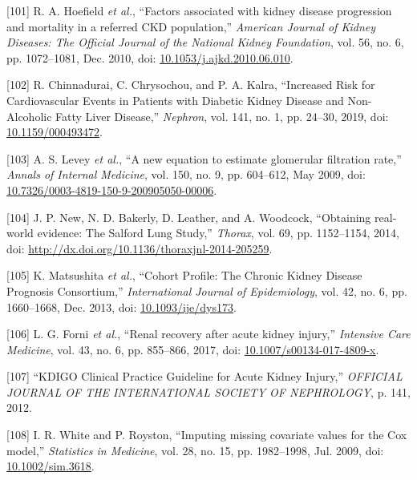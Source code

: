 \documentclass[12pt,PhD,twoside,openright]{muthesis}
\newenvironment{cslreferences}%
  {}%
  {\par}
\begin{document}
\begin{cslreferences}
\leavevmode\hypertarget{ref-hoefield_factors_2010}{}%
{[}101{]} R. A. Hoefield \emph{et al.}, ``Factors associated with kidney disease progression and mortality in a referred CKD population,'' \emph{American Journal of Kidney Diseases: The Official Journal of the National Kidney Foundation}, vol. 56, no. 6, pp. 1072--1081, Dec. 2010, doi: \href{https://doi.org/10.1053/j.ajkd.2010.06.010}{10.1053/j.ajkd.2010.06.010}.

\leavevmode\hypertarget{ref-chinnadurai_increased_2019-1}{}%
{[}102{]} R. Chinnadurai, C. Chrysochou, and P. A. Kalra, ``Increased Risk for Cardiovascular Events in Patients with Diabetic Kidney Disease and Non-Alcoholic Fatty Liver Disease,'' \emph{Nephron}, vol. 141, no. 1, pp. 24--30, 2019, doi: \href{https://doi.org/10.1159/000493472}{10.1159/000493472}.

\leavevmode\hypertarget{ref-levey_new_2009}{}%
{[}103{]} A. S. Levey \emph{et al.}, ``A new equation to estimate glomerular filtration rate,'' \emph{Annals of Internal Medicine}, vol. 150, no. 9, pp. 604--612, May 2009, doi: \href{https://doi.org/10.7326/0003-4819-150-9-200905050-00006}{10.7326/0003-4819-150-9-200905050-00006}.

\leavevmode\hypertarget{ref-new_obtaining_2014}{}%
{[}104{]} J. P. New, N. D. Bakerly, D. Leather, and A. Woodcock, ``Obtaining real-world evidence: The Salford Lung Study,'' \emph{Thorax}, vol. 69, pp. 1152--1154, 2014, doi: \href{https://doi.org/http://dx.doi.org/10.1136/thoraxjnl-2014-205259}{http://dx.doi.org/10.1136/thoraxjnl-2014-205259}.

\leavevmode\hypertarget{ref-matsushita_cohort_2013}{}%
{[}105{]} K. Matsushita \emph{et al.}, ``Cohort Profile: The Chronic Kidney Disease Prognosis Consortium,'' \emph{International Journal of Epidemiology}, vol. 42, no. 6, pp. 1660--1668, Dec. 2013, doi: \href{https://doi.org/10.1093/ije/dys173}{10.1093/ije/dys173}.

\leavevmode\hypertarget{ref-forni_renal_2017-1}{}%
{[}106{]} L. G. Forni \emph{et al.}, ``Renal recovery after acute kidney injury,'' \emph{Intensive Care Medicine}, vol. 43, no. 6, pp. 855--866, 2017, doi: \href{https://doi.org/10.1007/s00134-017-4809-x}{10.1007/s00134-017-4809-x}.

\leavevmode\hypertarget{ref-noauthor_kdigo_2012}{}%
{[}107{]} ``KDIGO Clinical Practice Guideline for Acute Kidney Injury,'' \emph{OFFICIAL JOURNAL OF THE INTERNATIONAL SOCIETY OF NEPHROLOGY}, p. 141, 2012.

\leavevmode\hypertarget{ref-white_imputing_2009}{}%
{[}108{]} I. R. White and P. Royston, ``Imputing missing covariate values for the Cox model,'' \emph{Statistics in Medicine}, vol. 28, no. 15, pp. 1982--1998, Jul. 2009, doi: \href{https://doi.org/10.1002/sim.3618}{10.1002/sim.3618}.


\end{cslreferences}
\end{document}
